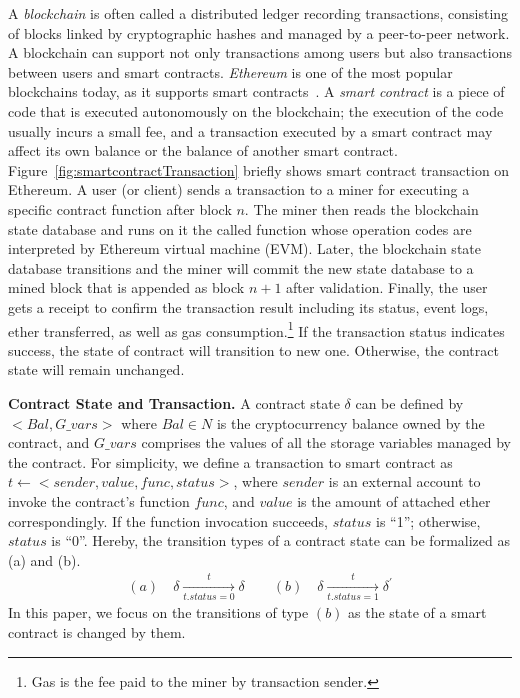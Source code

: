 A \emph{blockchain} is often called a distributed ledger recording transactions, consisting of blocks linked by cryptographic hashes and managed by a peer-to-peer network.
A blockchain can support not only transactions among users but also transactions between users and smart contracts.
\emph{Ethereum} is one of the most popular blockchains today, as it supports smart contracts~\cite{}.
A \emph{smart contract} is a piece of code that is executed autonomously on the blockchain; the execution of the code usually incurs a small fee, and a transaction executed by a smart contract may affect its own balance or the balance of another smart contract.
Figure~\ref{fig:smartcontractTransaction} briefly shows smart contract transaction on Ethereum.
A user (or client) sends a transaction to a miner for executing a specific contract function after block $n$.
The miner then reads the blockchain state database and runs on it the called function whose operation codes are interpreted by Ethereum virtual machine (EVM).
Later, the blockchain state database transitions and the miner will commit the new state database to a mined block that is appended as block $n+1$ after validation.
Finally, the user gets a receipt to confirm the transaction result including its status, event logs, ether transferred, as well as gas consumption.\footnote{Gas is the fee paid to the miner by transaction sender.}
If the transaction status indicates success, the state of contract will transition to new one. Otherwise, the contract state will remain unchanged.
\begin{definition}
	\textbf{Contract State and Transaction.} 
	A contract state $\delta$ can be defined by $<\mathit{Bal}, G\_\mathit{vars}>$ where $\mathit{Bal}\in N$ is the cryptocurrency balance owned by the contract, and $G\_\mathit{vars}$ comprises the values of all the storage variables managed by the contract.
	For simplicity, we define a transaction to smart contract as $t\leftarrow <\mathit{sender}, \mathit{value}, \mathit{func}, \mathit{status}>$, where $\mathit{sender}$ is an external account to invoke the contract's function $\mathit{func}$, and $\mathit{value}$ is the amount of attached ether correspondingly. 
	If the function invocation succeeds, $\mathit{status}$ is ``1''; otherwise, $\mathit{status}$ is ``0''. 
	Hereby, the transition types of a contract state can be formalized as (a) and (b).
	\begin{align*}
		(a)\quad\delta \xrightarrow[t.\mathit{status}=0]{t} \delta \quad \quad
		(b)\quad\delta \xrightarrow[t.\mathit{status}=1]{t} \delta^{'}
	\end{align*}
	In this paper, we focus on the transitions of type $(b)$ as the state of a smart contract is changed by them.
\end{definition}

